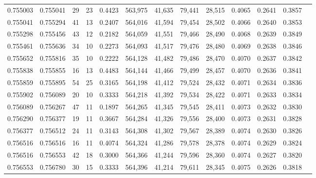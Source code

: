 \begin{tabular}{rrrrrrrrrrrrr}
0.755003 & 0.755041 &    29 &  23 &                                     0.4423 & 563,975 &  41,635 &  79,441 &  28,515 & 0.4065 & 0.2641 & 0.3857 \\
0.755041 & 0.755294 &    41 &  13 &                                     0.2407 & 564,016 &  41,594 &  79,454 &  28,502 & 0.4066 & 0.2640 & 0.3853 \\
0.755298 & 0.755456 &    43 &  12 &                                     0.2182 & 564,059 &  41,551 &  79,466 &  28,490 & 0.4068 & 0.2639 & 0.3849 \\
0.755461 & 0.755636 &    34 &  10 &                                     0.2273 & 564,093 &  41,517 &  79,476 &  28,480 & 0.4069 & 0.2638 & 0.3846 \\
0.755652 & 0.755816 &    35 &  10 &                                     0.2222 & 564,128 &  41,482 &  79,486 &  28,470 & 0.4070 & 0.2637 & 0.3842 \\
0.755838 & 0.755855 &    16 &  13 &                                     0.4483 & 564,144 &  41,466 &  79,499 &  28,457 & 0.4070 & 0.2636 & 0.3841 \\
0.755859 & 0.755895 &    54 &  25 &                                     0.3165 & 564,198 &  41,412 &  79,524 &  28,432 & 0.4071 & 0.2634 & 0.3836 \\
0.755902 & 0.756089 &    20 &  10 &                                     0.3333 & 564,218 &  41,392 &  79,534 &  28,422 & 0.4071 & 0.2633 & 0.3834 \\
0.756089 & 0.756267 &    47 &  11 &                                     0.1897 & 564,265 &  41,345 &  79,545 &  28,411 & 0.4073 & 0.2632 & 0.3830 \\
0.756290 & 0.756377 &    19 &  11 &                                     0.3667 & 564,284 &  41,326 &  79,556 &  28,400 & 0.4073 & 0.2631 & 0.3828 \\
0.756377 & 0.756512 &    24 &  11 &                                     0.3143 & 564,308 &  41,302 &  79,567 &  28,389 & 0.4074 & 0.2630 & 0.3826 \\
0.756516 & 0.756516 &    16 &  11 &                                     0.4074 & 564,324 &  41,286 &  79,578 &  28,378 & 0.4074 & 0.2629 & 0.3824 \\
0.756516 & 0.756553 &    42 &  18 &                                     0.3000 & 564,366 &  41,244 &  79,596 &  28,360 & 0.4074 & 0.2627 & 0.3820 \\
0.756553 & 0.756780 &    30 &  15 &                                     0.3333 & 564,396 &  41,214 &  79,611 &  28,345 & 0.4075 & 0.2626 & 0.3818 \\

\end{tabular}
